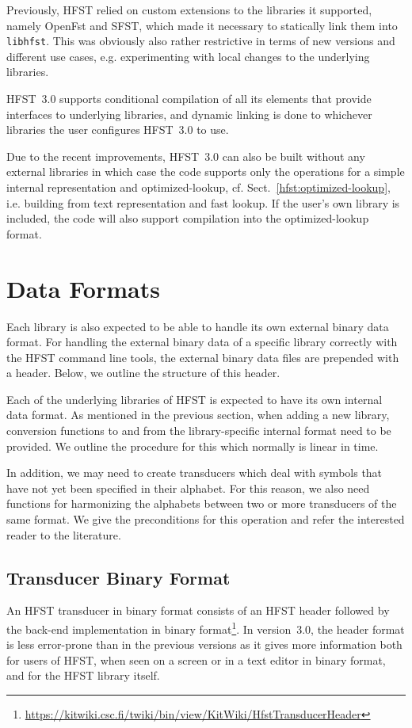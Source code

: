 \documentclass{llncs}
\begin{document}
Previously, HFST relied on custom extensions to the libraries it supported,
namely OpenFst and SFST, which made it necessary to statically link them into
\verb+libhfst+. This was obviously also rather restrictive in terms of
new versions and different use cases, e.g. experimenting with local changes to
the underlying libraries.

HFST~3.0 supports conditional compilation of all its elements that provide
interfaces to underlying libraries, and dynamic linking is done to whichever
libraries the user configures HFST~3.0 to use.

Due to the recent improvements, HFST~3.0 can also be built without any external
libraries in which case the code supports only the operations for a simple internal
representation and optimized-lookup, cf. Sect.~\ref{hfst:optimized-lookup},
i.e. building from text representation and fast lookup. If the user's own library is included, 
the code will also support compilation into the optimized-lookup format.


\section{Data Formats}\label{hfst:data-formats}
Each library is also expected to be able to handle its own external binary data format.
For handling the external binary data of a specific library correctly with the HFST command line tools, 
the external binary data files are prepended with a header. Below, we outline the structure 
of this header.

Each of the underlying libraries of HFST is expected to have its own internal data format. 
As mentioned in the previous section, when adding a new library, conversion functions 
to and from the library-specific internal format need to be provided. We outline the procedure
for this which normally is linear in time.

In addition, we may need to create transducers which deal with symbols that have
not yet been specified in their alphabet. For this reason, we also need functions for harmonizing 
the alphabets between two or more transducers of the same format. We give the
preconditions for this operation and refer the interested reader to the literature.

\subsection{Transducer Binary Format}
An HFST transducer in binary format consists of an HFST header followed by the
back-end implementation in binary 
format\footnote{\url{https://kitwiki.csc.fi/twiki/bin/view/KitWiki/HfstTransducerHeader}}. 
In version~3.0, the header
format is less error-prone than in the previous versions as it gives more 
information both for users of HFST, when seen on a screen or in a
text editor in binary format, and for the HFST library itself.
 
\end{document}
